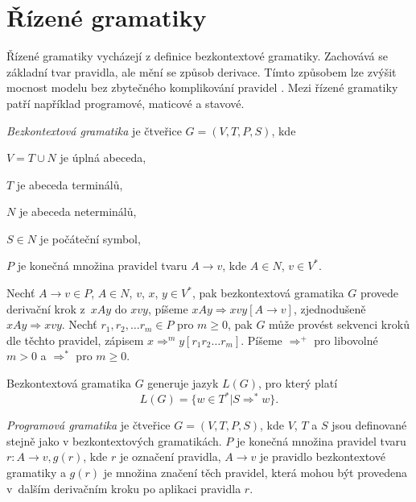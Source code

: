 \section{Řízené gramatiky}

Řízené gramatiky vycházejí z definice bezkontextové gramatiky. Zachovává se základní tvar pravidla, ale mění se způsob derivace. Tímto způsobem lze zvýšit mocnost modelu bez zbytečného komplikování pravidel \cite{Krivka}. Mezi řízené gramatiky patří například programové, maticové a stavové.  

\begin{Def}\label{def_bezkontext_gram}

\emph{Bezkontextová gramatika} \cite{Krivka:RewritingSystems} je čtveřice $G = (V,T,P,S)$, kde 
\begin{description*}
\item $V = T \cup N$ je úplná abeceda, 
\item $T$ je abeceda terminálů, 
\item $N$ je abeceda neterminálů, 
\item $S \in N$ je počáteční symbol, 
\item $P$ je konečná množina pravidel tvaru $A \rightarrow v$, kde $A \in N$, $v \in V^*$.
\end{description*}
Nechť $A \rightarrow v \in P$, $A \in N$, $v$, $x$, $y \in V^*$, pak bezkontextová gramatika $G$ provede derivační krok z~$xAy$ do $xvy$, píšeme $xAy \Rightarrow xvy [A \rightarrow v]$, zjednodušeně $xAy \Rightarrow xvy$. 
Nechť $r_1, r_2, \dots r_m \in P$ pro $m \ge 0$, pak $G$ může provést sekvenci kroků dle těchto pravidel, zápisem $x {\Rightarrow}^m y [r_1 r_2 \dots r_m]$. Píšeme ${\Rightarrow}^+$ pro libovolné $m > 0$ a ${\Rightarrow}^*$ pro $m \ge 0$. 

Bezkontextová gramatika $G$ generuje jazyk $L(G)$, pro který platí $$L(G) = \{w \in T^* | S {\Rightarrow}^* w\}.$$ 

\end{Def}

\begin{Def}
\emph{Programová gramatika} \cite{Krivka:RewritingSystems} je čtveřice $G = (V,T,P,S)$, kde $V$, $T$ a $S$ jsou definované stejně jako v bezkontextových gramatikách. $P$ je konečná množina pravidel tvaru $r \colon A \rightarrow v, g(r)$, kde $r$ je označení pravidla, $A \rightarrow v$ je pravidlo bezkontextové gramatiky a $g(r)$ je množina značení těch pravidel, která mohou být provedena v~dalším derivačním kroku po aplikaci pravidla $r$.
\end{Def}

